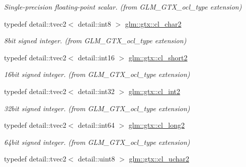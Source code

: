 \begin{DoxyCompactItemize}
\begin{DoxyCompactList}\small\item\em Single-\/precision floating-\/point scalar. (from G\+L\+M\+\_\+\+G\+T\+X\+\_\+ocl\+\_\+type extension) \end{DoxyCompactList}\item 
\hypertarget{group__gtx__ocl__type_ga4f248e31c65421cc3e47015c0507d8ab}{}typedef detail\+::tvec2$<$ detail\+::int8 $>$ \hyperlink{group__gtx__ocl__type_ga4f248e31c65421cc3e47015c0507d8ab}{glm\+::gtx\+::cl\+\_\+char2}\label{group__gtx__ocl__type_ga4f248e31c65421cc3e47015c0507d8ab}

\begin{DoxyCompactList}\small\item\em 8bit signed integer. (from G\+L\+M\+\_\+\+G\+T\+X\+\_\+ocl\+\_\+type extension) \end{DoxyCompactList}\item 
\hypertarget{group__gtx__ocl__type_ga5eb81aace48ea52659c6928c8ae35786}{}typedef detail\+::tvec2$<$ detail\+::int16 $>$ \hyperlink{group__gtx__ocl__type_ga5eb81aace48ea52659c6928c8ae35786}{glm\+::gtx\+::cl\+\_\+short2}\label{group__gtx__ocl__type_ga5eb81aace48ea52659c6928c8ae35786}

\begin{DoxyCompactList}\small\item\em 16bit signed integer. (from G\+L\+M\+\_\+\+G\+T\+X\+\_\+ocl\+\_\+type extension) \end{DoxyCompactList}\item 
\hypertarget{group__gtx__ocl__type_ga03cc72247f6ac05afbc6d20af0b002a1}{}typedef detail\+::tvec2$<$ detail\+::int32 $>$ \hyperlink{group__gtx__ocl__type_ga03cc72247f6ac05afbc6d20af0b002a1}{glm\+::gtx\+::cl\+\_\+int2}\label{group__gtx__ocl__type_ga03cc72247f6ac05afbc6d20af0b002a1}

\begin{DoxyCompactList}\small\item\em 32bit signed integer. (from G\+L\+M\+\_\+\+G\+T\+X\+\_\+ocl\+\_\+type extension) \end{DoxyCompactList}\item 
\hypertarget{group__gtx__ocl__type_ga524aece5466230efb20d882811be6939}{}typedef detail\+::tvec2$<$ detail\+::int64 $>$ \hyperlink{group__gtx__ocl__type_ga524aece5466230efb20d882811be6939}{glm\+::gtx\+::cl\+\_\+long2}\label{group__gtx__ocl__type_ga524aece5466230efb20d882811be6939}

\begin{DoxyCompactList}\small\item\em 64bit signed integer. (from G\+L\+M\+\_\+\+G\+T\+X\+\_\+ocl\+\_\+type extension) \end{DoxyCompactList}\item 
\hypertarget{group__gtx__ocl__type_ga70ff4e0806455ba4351765261a5265c2}{}typedef detail\+::tvec2$<$ detail\+::uint8 $>$ \hyperlink{group__gtx__ocl__type_ga70ff4e0806455ba4351765261a5265c2}{glm\+::gtx\+::cl\+\_\+uchar2}\label{group__gtx__ocl__type_ga70ff4e0806455ba4351765261a5265c2}


\end{DoxyCompactItemize}
